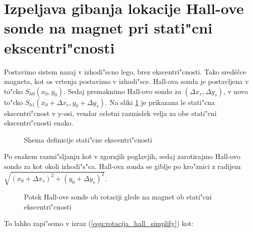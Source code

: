 \section{Izpeljava gibanja lokacije Hall-ove sonde na magnet pri stati"cni ekscentri"cnosti}


Postavimo sistem nazaj v izhodi"scno lego, brez ekscentri"cnosti. Tako sredščce magneta, kot os vrtenja postavimo v izhodi"sce. Hall-ova sonda je postavljena v to"cko $S_{h0}(x_0,y_0)$. Sedaj premaknimo Hall-ovo sondo za $(\Delta x_s, \Delta y_s)$, v novo to"cko $S_{h1}(x_0+\Delta x_s, y_0+\Delta y_s)$. Na sliki \ref{fig:def_sta_eks} je prikazana le stati"cna ekscentri"cnost v y-osi, vendar celotni razmislek velja za obe stati"cni ekscentri"cnosti enako.


\begin{figure}[h!]
	\centering
	\caption{Shema definicije stati"cne ekscentri"cnosti}
	\label{fig:def_sta_eks}
\end{figure}

Po enakem razmi"sljanju kot v zgornjih poglavjih, sedaj zarotirajmo Hall-ovo sondo za kot \kol{-\theta} okoli izhodi"s"ca. Hall-ova sonda se giblje po kro"znici z radijem $\sqrt{(x_0+\Delta x_s)^2+(y_0+\Delta y_s)^2}$.


\begin{figure}[h!]
	\centering
	\caption{Potek Hall-ove sonde ob rotaciji glede na magnet ob stati"cni ekscentri"cnosti}
	\label{fig:def_sta_eks_stat}
\end{figure}


To lahko zapi"semo v izraz (\ref{equ:rotacija_hall_simplify}) kot:

